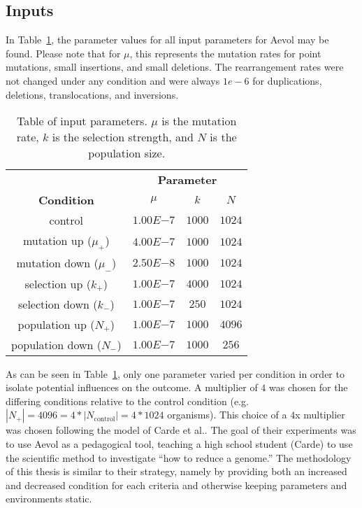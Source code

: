 \subsection{Inputs}
In Table~\ref{table:input_parameters}, the parameter values for all input parameters for Aevol may be found. Please note that for $\mu$, this represents the mutation rates for point mutations, small insertions, and small deletions. The rearrangement rates were not changed under any condition and were always $1e-6$ for duplications, deletions, translocations, and inversions. 

\begin{table}[h]
	\centering
	\begin{tabular}{|c||c|c|c|}
		\hline
		 & \multicolumn{3}{c|}{\textbf{Parameter}} \\
		\cline{2-4}
		\textbf{Condition} &$\mu$ & $k$ & $N$ \\
		\hline
		control & $1.00E{-7}$ & $1000$ & $1024$ \\
		\hline
		mutation up ($\mu_+$) & $4.00E{-7}$ & $1000$ & $1024$ \\
		\hline
		mutation down ($\mu_-$) & $2.50E{-8}$ & $1000$ & $1024$ \\
		\hline
		selection up ($k_+$) & $1.00E{-7}$ & $4000$ & $1024$ \\
		\hline
		selection down ($k_-$) & $1.00E{-7}$ & $250$ & $1024$ \\
		\hline
		population up ($N_+$) & $1.00E{-7}$ & $1000$ & $4096$ \\
		\hline
		population down ($N_-$) & $1.00E{-7}$ & $1000$ & $256$ \\		
		\hline
	\end{tabular}
	\caption[Table of parameters]{Table of input parameters. $\mu$ is the mutation rate, $k$ is the selection strength, and $N$ is the population size.}
	\label{table:input_parameters}
\end{table}
As can be seen in Table~\ref{table:input_parameters}, only one parameter varied per condition in order to isolate potential influences on the outcome. A multiplier of $4$ was chosen for the differing conditions relative to the control condition (e.g. $|N_+| = 4096 = 4*|N_\text{control}| = 4*1024$ organisms). This choice of a $4$x multiplier was chosen following the model of Carde et al.\cite{carde.2019}. The goal of their experiments was to use Aevol as a pedagogical tool, teaching a high school student (Carde) to use the scientific method to investigate ``how to reduce a genome.'' The methodology of this thesis is similar to their strategy, namely by providing both an increased and decreased condition for each criteria and otherwise keeping parameters and environments static.


